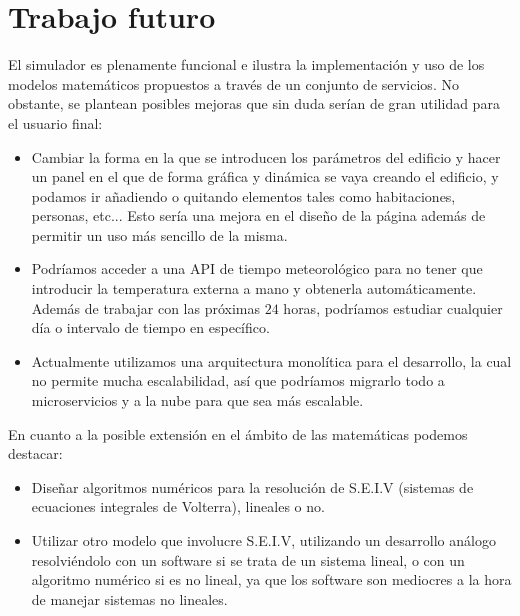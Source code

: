 \section{Trabajo futuro}
El simulador es plenamente funcional e ilustra la implementación y uso de los modelos matemáticos propuestos a través de un conjunto de servicios. No obstante, se plantean posibles mejoras que sin duda serían de gran utilidad para el usuario final:
\begin{itemize}
	\item Cambiar la forma en la que se introducen los parámetros del edificio y hacer un panel en el que de forma gráfica y dinámica se vaya creando el edificio, y podamos ir añadiendo o quitando elementos tales como habitaciones, personas, etc... Esto sería una mejora en el diseño de la página además de permitir un uso más sencillo de la misma.
	\item Podríamos acceder a una API de tiempo meteorológico para no tener que introducir la temperatura externa a mano y obtenerla automáticamente. Además de trabajar con las próximas $24$ horas, podríamos estudiar cualquier día o intervalo de tiempo en específico.
	\item Actualmente utilizamos una arquitectura monolítica para el desarrollo, la cual no permite mucha escalabilidad, así que podríamos migrarlo todo a microservicios y a la nube para que sea más escalable.
\end{itemize}
En cuanto a la posible extensión en el ámbito de las matemáticas podemos destacar:
\begin{itemize}
	\item Diseñar algoritmos numéricos para la resolución de S.E.I.V (sistemas de ecuaciones integrales de Volterra), lineales o no.
	\item Utilizar otro modelo que involucre S.E.I.V, utilizando un desarrollo análogo resolviéndolo con un software si se trata de un sistema lineal, o con un algoritmo numérico si es no lineal, ya que los software son mediocres a la hora de manejar sistemas no lineales.
\end{itemize}
\endinput
